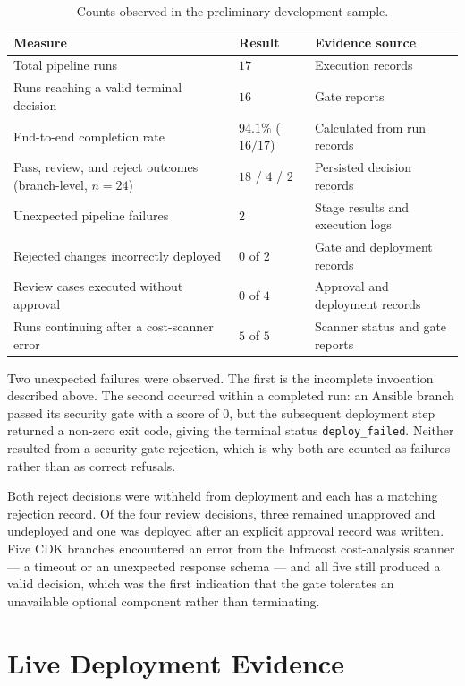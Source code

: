\begin{table}[ht]
\centering
\caption{Counts observed in the preliminary development sample.}
\label{tab:app-preliminary-counts}
\begin{tabular}{|L{5.9cm}|C{3.0cm}|L{4.7cm}|}
\hline
\textbf{Measure} & \textbf{Result} & \textbf{Evidence source} \\
\hline
Total pipeline runs & $17$ & Execution records \\
\hline
Runs reaching a valid terminal decision & $16$ & Gate reports \\
\hline
End-to-end completion rate & $94.1\%$ ($16/17$) & Calculated from run records \\
\hline
Pass, review, and reject outcomes (branch-level, $n=24$) & $18$ / $4$ / $2$ &
Persisted decision records \\
\hline
Unexpected pipeline failures & $2$ & Stage results and execution logs \\
\hline
Rejected changes incorrectly deployed & $0$ of $2$ & Gate and deployment records \\
\hline
Review cases executed without approval & $0$ of $4$ & Approval and deployment records \\
\hline
Runs continuing after a cost-scanner error & $5$ of $5$ & Scanner status and gate reports \\
\hline
\end{tabular}
\end{table}

Two unexpected failures were observed. The first is the incomplete invocation
described above. The second occurred within a completed run: an Ansible branch
passed its security gate with a score of $0$, but the subsequent deployment step
returned a non-zero exit code, giving the terminal status
\texttt{deploy\_failed}. Neither resulted from a security-gate rejection, which
is why both are counted as failures rather than as correct refusals.

Both reject decisions were withheld from deployment and each has a matching
rejection record. Of the four review decisions, three remained unapproved and
undeployed and one was deployed after an explicit approval record was written.
Five CDK branches encountered an error from the Infracost cost-analysis scanner
--- a timeout or an unexpected response schema --- and all five still produced a
valid decision, which was the first indication that the gate tolerates an
unavailable optional component rather than terminating.

\section{Live Deployment Evidence}

